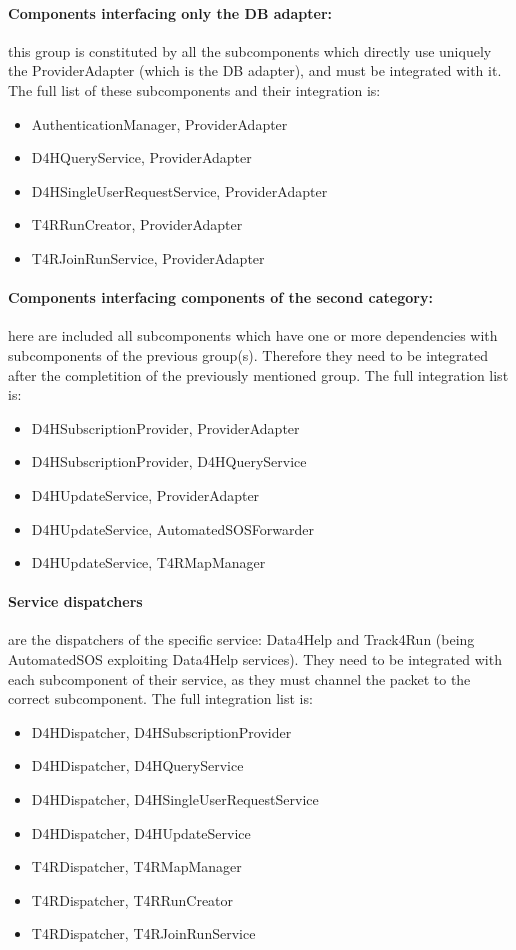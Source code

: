 \paragraph{Components interfacing only the DB adapter:} this group is constituted by all the subcomponents which directly use uniquely the ProviderAdapter (which is the DB adapter), and must be integrated with it. The full list of these subcomponents and their integration is:
\begin{itemize}
\item AuthenticationManager, ProviderAdapter
\item D4HQueryService, ProviderAdapter
\item D4HSingleUserRequestService, ProviderAdapter
\item T4RRunCreator, ProviderAdapter
\item T4RJoinRunService, ProviderAdapter
\end{itemize}

\paragraph{Components interfacing components of the second category:} here are included all subcomponents which have one or more dependencies with subcomponents of the previous group(s). Therefore they need to be integrated after the completition of the previously mentioned group. The full integration list is:
\begin{itemize}
\item D4HSubscriptionProvider, ProviderAdapter
\item D4HSubscriptionProvider, D4HQueryService
\item D4HUpdateService, ProviderAdapter
\item D4HUpdateService, AutomatedSOSForwarder
\item D4HUpdateService, T4RMapManager
\end{itemize}

\paragraph{Service dispatchers} are the dispatchers of the specific service: Data4Help and Track4Run (being AutomatedSOS exploiting Data4Help services). They need to be integrated with each subcomponent of their service, as they must channel the packet to the correct subcomponent. The full integration list is:
\begin{itemize}
\item D4HDispatcher, D4HSubscriptionProvider
\item D4HDispatcher, D4HQueryService
\item D4HDispatcher, D4HSingleUserRequestService
\item D4HDispatcher, D4HUpdateService
\item T4RDispatcher, T4RMapManager
\item T4RDispatcher, T4RRunCreator
\item T4RDispatcher, T4RJoinRunService
\end{itemize}

